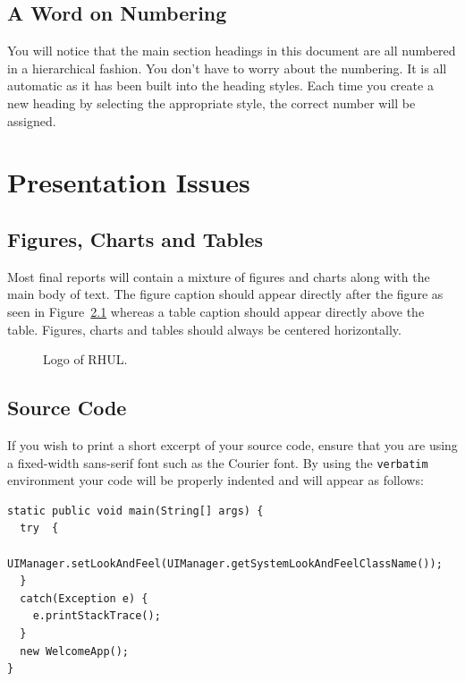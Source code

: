 \documentclass[]{final_report}
\begin{document}
\section{A Word on Numbering}
You will notice that the main section headings in this document are all numbered in a hierarchical fashion. You don't have to worry about the numbering. It is all automatic as it has been built into the heading styles. Each time you create a new heading by selecting the appropriate style, the correct number will be assigned. 


\chapter{Presentation Issues}

\section{Figures, Charts and Tables}

Most final reports will contain a mixture of figures and charts along with the main body of text. The figure caption should appear directly after the figure as seen in Figure~\ref{fig:logo} whereas a table caption should appear directly above the table. Figures, charts and tables should always be centered horizontally. 

\begin{figure}[h]
\centering
\fboxsep 2mm
\caption{\label{fig:logo} Logo of RHUL.}
\end{figure} 

\section{Source Code}

If you wish to print a short excerpt of your source code,  ensure that you are using a fixed-width sans-serif font such as the Courier font. By using the \verb|verbatim| environment your code will be properly indented and will appear as follows:

\begin{verbatim}
static public void main(String[] args) {
  try  {
    UIManager.setLookAndFeel(UIManager.getSystemLookAndFeelClassName());
  }
  catch(Exception e) {
    e.printStackTrace();
  }
  new WelcomeApp();
} 
\end{verbatim}
\end{document}

